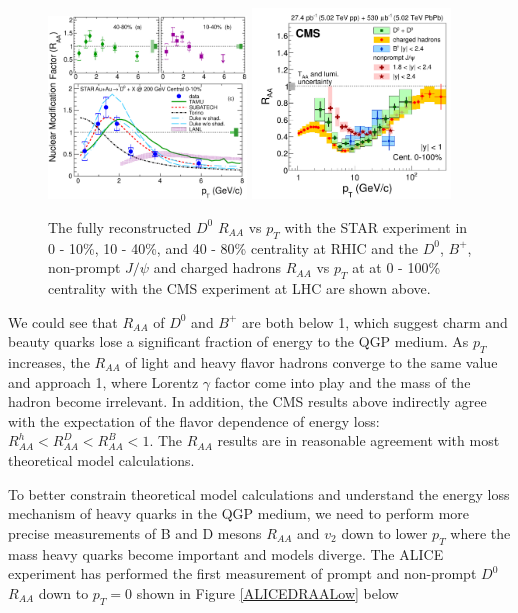 \begin{figure}[hbtp]
\begin{center}
\includegraphics[width=0.47\textwidth]{Figures/Chapter2/STARRAA.eps}
\includegraphics[width=0.47\textwidth]{Figures/Chapter2/CMSRAA.png}
\caption{The fully reconstructed $D^0$ $R_{AA}$ vs $p_T$ with the STAR experiment in 0 - 10\%, 10 - 40\%, and 40 - 80\% centrality at RHIC and the $D^0$, $B^+$, non-prompt $J/\psi$ and charged hadrons $R_{AA}$ vs $p_T$ at at 0 - 100\% centrality with the CMS experiment at LHC are shown above.}
\label{HQRAA}
\end{center}
\end{figure}   

We could see that $R_{AA}$ of $D^0$ and $B^+$ are both below 1, which suggest charm and beauty quarks lose a significant fraction of energy to the QGP medium. As $p_T$ increases, the $R_{AA}$ of light and heavy flavor hadrons converge to the same value and approach 1, where Lorentz $\gamma$ factor come into play and the mass of the hadron become irrelevant. In addition, the CMS results above indirectly agree with the expectation of the flavor dependence of energy loss: $R_{AA}^{h} < R_{AA}^{D} < R_{AA}^{B} < 1$. The $R_{AA}$ results are in reasonable agreement with most theoretical model calculations. 

To better constrain theoretical model calculations and understand the energy loss mechanism of heavy quarks in the QGP medium, we need to perform more precise measurements of B and D mesons $R_{AA}$ and $v_2$ down to lower $p_T$ where the mass heavy quarks become important and models diverge. The ALICE experiment has performed the first measurement of prompt and non-prompt $D^0$ $R_{AA}$ down to $p_T = $0 shown in Figure \ref{ALICEDRAALow} below


